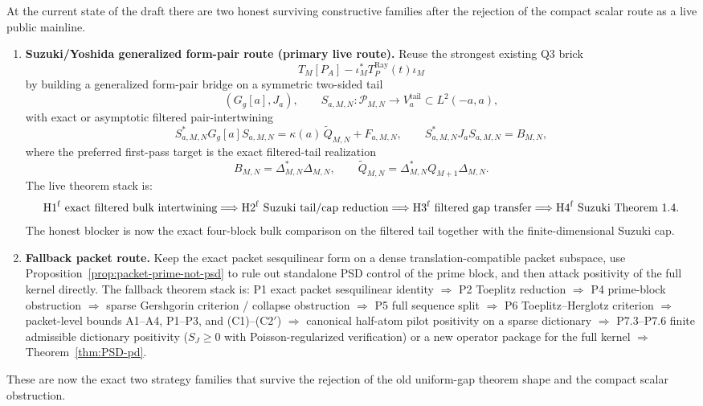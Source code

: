 \begin{remark}\label{rem:psd-pd-strategies}
At the current state of the draft there are two honest surviving constructive
families after the rejection of the compact scalar route as a live public
mainline.
\begin{enumerate}
  \item \textbf{Suzuki/Yoshida generalized form-pair route (primary live route).}
  Reuse the strongest existing Q3 brick
  \[
    T_M[P_A]-\iota_M^*T_P^{\mathrm{Ray}}(t)\iota_M
  \]
  by building a generalized form-pair bridge on a symmetric two-sided tail
  \[
    (G_g[a],J_a),\qquad S_{a,M,N}:\mathcal P_{M,N}\to V_a^{\mathrm{tail}}\subset L^2(-a,a),
  \]
  with exact or asymptotic filtered pair-intertwining
  \[
    S_{a,M,N}^*G_g[a]S_{a,M,N}
    =
    \kappa(a)\,\widetilde Q_{M,N}+F_{a,M,N},
    \qquad
    S_{a,M,N}^*J_aS_{a,M,N}=B_{M,N},
  \]
  where the preferred first-pass target is the exact filtered-tail realization
  \[
    B_{M,N}=\Delta_{M,N}^*\Delta_{M,N},
    \qquad
    \widetilde Q_{M,N}=\Delta_{M,N}^*Q_{M+1}\Delta_{M,N}.
  \]
  The live theorem stack is:
  \[
    \textup{H1}^{\mathrm f}\ \textup{exact filtered bulk intertwining}
    \Longrightarrow
    \textup{H2}^{\mathrm f}\ \textup{Suzuki tail/cap reduction}
    \Longrightarrow
    \textup{H3}^{\mathrm f}\ \textup{filtered gap transfer}
    \Longrightarrow
    \textup{H4}^{\mathrm f}\ \textup{Suzuki Theorem 1.4}.
  \]
  The honest blocker is now the exact four-block bulk comparison on the
  filtered tail together with the finite-dimensional Suzuki cap.
  \item \textbf{Fallback packet route.} Keep the exact packet sesquilinear form
  on a dense translation-compatible packet subspace, use
  Proposition~\ref{prop:packet-prime-not-psd} to rule out standalone PSD control
  of the prime block, and then attack positivity of the full kernel directly.
  The fallback theorem stack is:
  \textup{P1} exact packet sesquilinear identity
  $\Longrightarrow$
  \textup{P2} Toeplitz reduction
  $\Longrightarrow$
  \textup{P4} prime-block obstruction
  $\Longrightarrow$
  sparse Gershgorin criterion / collapse obstruction
  $\Longrightarrow$
  \textup{P5} full sequence split
  $\Longrightarrow$
  \textup{P6} Toeplitz--Herglotz criterion
  $\Longrightarrow$
  packet-level bounds \textup{A1}--\textup{A4}, \textup{P1}--\textup{P3},
  and \textup{(C1)}--\textup{(C2$'$)}
  $\Longrightarrow$
  canonical half-atom pilot positivity on a sparse dictionary
  $\Longrightarrow$
  \textup{P7.3}--\textup{P7.6} finite admissible dictionary positivity
  ($S_J\ge0$ with Poisson-regularized verification) or a new operator package for the full kernel
  $\Longrightarrow$
  Theorem~\ref{thm:PSD-pd}.
\end{enumerate}
These are now the exact two strategy families that survive the rejection of the
old uniform-gap theorem shape and the compact scalar obstruction.
\end{remark}

